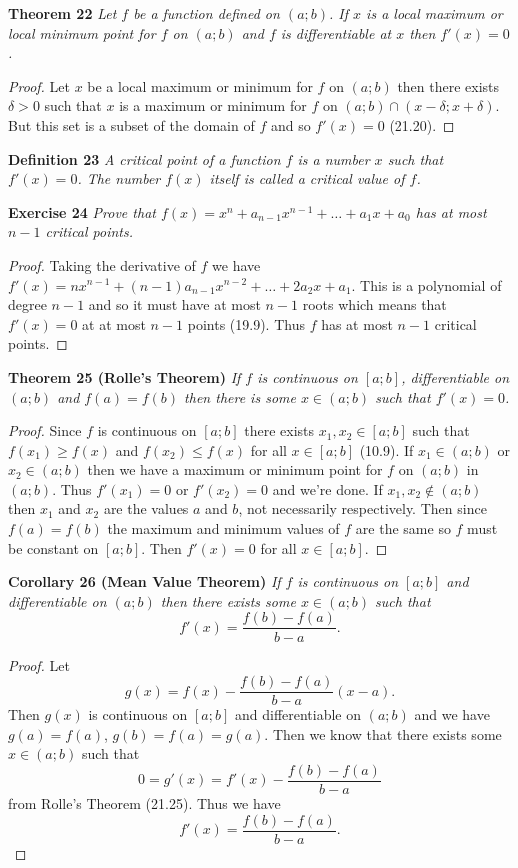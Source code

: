 \documentclass{article}
\begin{document}
\begin{flushleft}
\textbf{Theorem 22}
\textsl{Let $f$ be a function defined on $(a;b)$. If $x$ is a local maximum or local minimum point for $f$ on $(a;b)$ and $f$ is differentiable at $x$ then $f'(x) = 0$.}
\begin{proof}
Let $x$ be a local maximum or minimum for $f$ on $(a;b)$ then there exists $\delta > 0$ such that $x$ is a maximum or minimum for $f$ on $(a;b) \cap (x - \delta; x + \delta)$. But this set is a subset of the domain of $f$ and so $f'(x) = 0$ (21.20).
\end{proof}

\textbf{Definition 23}
\textsl{A critical point of a function $f$ is a number $x$ such that $f'(x) = 0$. The number $f(x)$ itself is called a critical value of $f$.}\newline

\textbf{Exercise 24}
\textsl{Prove that $f(x) = x^n + a_{n-1} x^{n-1} + \dots + a_1 x + a_0$ has at most $n-1$ critical points.}
\begin{proof}
Taking the derivative of $f$ we have $f'(x) = nx^{n-1} + (n-1)a_{n-1}x^{n-2} + \dots + 2a_2 x + a_1$. This is a polynomial of degree $n-1$ and so it must have at most $n-1$ roots which means that $f'(x) = 0$ at at most $n-1$ points (19.9). Thus $f$ has at most $n-1$ critical points.
\end{proof}

\textbf{Theorem 25 (Rolle's Theorem)}
\textsl{If $f$ is continuous on $[a;b]$, differentiable on $(a;b)$ and $f(a) = f(b)$ then there is some $x \in (a;b)$ such that $f'(x) = 0$.}
\begin{proof}
Since $f$ is continuous on $[a;b]$ there exists $x_1, x_2 \in [a;b]$ such that $f(x_1) \geq f(x)$ and $f(x_2) \leq f(x)$ for all $x \in [a;b]$ (10.9). If $x_1 \in (a;b)$ or $x_2 \in (a;b)$ then we have a maximum or minimum point for $f$ on $(a;b)$ in $(a;b)$. Thus $f'(x_1) = 0$ or $f'(x_2) = 0$ and we're done. If $x_1, x_2 \notin (a;b)$ then $x_1$ and $x_2$ are the values $a$ and $b$, not necessarily respectively. Then since $f(a) = f(b)$ the maximum and minimum values of $f$ are the same so $f$ must be constant on $[a;b]$. Then $f'(x) = 0$ for all $x \in [a;b]$.
\end{proof}

\textbf{Corollary 26 (Mean Value Theorem)}
\textsl{If $f$ is continuous on $[a;b]$ and differentiable on $(a;b)$ then there exists some $x \in (a;b)$ such that
\[
f'(x) = \frac{f(b) - f(a)}{b-a}.
\]}
\begin{proof}
Let
\[
g(x) = f(x) - \frac{f(b) - f(a)}{b-a} (x-a).
\]
Then $g(x)$ is continuous on $[a;b]$ and differentiable on $(a;b)$ and we have $g(a) = f(a)$, $g(b) = f(a) = g(a)$. Then we know that there exists some $x \in (a;b)$ such that
\[
0 = g'(x) = f'(x) - \frac{f(b) - f(a)}{b-a}
\]
from Rolle's Theorem (21.25). Thus we have
\[
f'(x) = \frac{f(b) - f(a)}{b-a}.
\]
\end{proof}


\end{flushleft}
\end{document}
